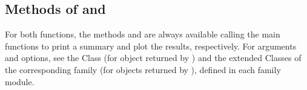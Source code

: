 \documentclass[letterpaper,10pt,english]{sphinxmanual}
\begin{document}
\subsection{Methods of  and }
\label{\detokenize{manual:methods-of-estimate-and-draw}}
\sphinxAtStartPar
For both functions, the methods  and  are always available calling the
main functions to print a summary and plot the results, respectively. For  arguments
and options, see  the  Class
(for object returned by )
and the extended  Classes of the corresponding
family (for objects returned by ), defined in each family module.
\end{document}
